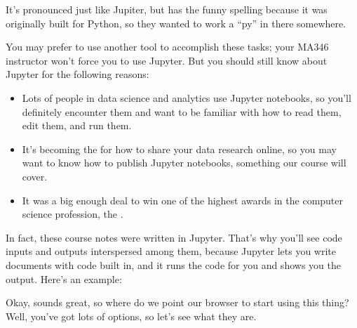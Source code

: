 \documentclass[letterpaper,10pt,english]{jupyterBook}
\begin{document}
\sphinxAtStartPar
It’s pronounced just like Jupiter, but has the funny spelling because it was originally built for Python, so they wanted to work a “py” in there somewhere.

\sphinxAtStartPar
You may prefer to use another tool to accomplish these tasks; your MA346 instructor won’t force you to use Jupyter.  But you should still know about Jupyter for the following reasons:
\begin{itemize}
\item {} 
\sphinxAtStartPar
Lots of people in data science and analytics use Jupyter notebooks, so you’ll definitely encounter them and want to be familiar with how to read them, edit them, and run them.

\item {} 
\sphinxAtStartPar
It’s becoming the  for how to share your data research online, so you may want to know how to publish Jupyter notebooks, something our course will cover.

\item {} 
\sphinxAtStartPar
It was a big enough deal to win one of the highest awards in the computer science profession, the .

\end{itemize}

\sphinxAtStartPar
In fact, these course notes were written in Jupyter.  That’s why you’ll see code inputs and outputs interspersed among them, because Jupyter lets you write documents with code built in, and it runs the code for you and shows you the output.  Here’s an example:

\begin{sphinxVerbatim}[commandchars=\\\{\}]
   
 \PYG{p}{[}    \PYG{p}{]} 
\end{sphinxVerbatim}

\noindent{}

\sphinxAtStartPar
Okay, sounds great, so where do we point our browser to start using this thing?  Well, you’ve got lots of options, so let’s see what they are.
\end{document}
